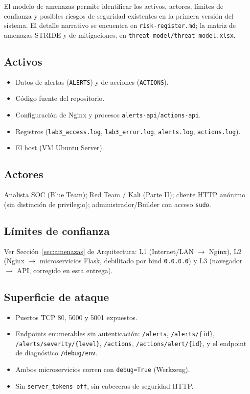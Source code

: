 \documentclass[journal]{IEEEtran}
\begin{document}
El modelo de amenazas permite identificar los activos, actores, límites de
confianza y posibles riesgos de seguridad existentes en la primera versión
del sistema. El detalle narrativo se encuentra en \texttt{risk-register.md};
la matriz de amenazas STRIDE y de mitigaciones, en
\texttt{threat-model/threat-model.xlsx}.

\subsection{Activos}

\begin{itemize}
    \item Datos de alertas (\texttt{ALERTS}) y de acciones (\texttt{ACTIONS}).
    \item Código fuente del repositorio.
    \item Configuración de Nginx y procesos \texttt{alerts-api}/\texttt{actions-api}.
    \item Registros (\texttt{lab3\_access.log}, \texttt{lab3\_error.log},
    \texttt{alerts.log}, \texttt{actions.log}).
    \item El host (VM Ubuntu Server).
\end{itemize}

\subsection{Actores}

Analista SOC (Blue Team); Red Team / Kali (Parte II); cliente HTTP anónimo (sin
distinción de privilegio); administrador/Builder con acceso \texttt{sudo}.

\subsection{Límites de confianza}

Ver Sección~\ref{sec:amenazas} de Arquitectura: L1 (Internet/LAN
$\rightarrow$ Nginx), L2 (Nginx $\rightarrow$ microservicios Flask, debilitado
por bind \texttt{0.0.0.0}) y L3 (navegador $\rightarrow$ API, corregido en
esta entrega).

\subsection{Superficie de ataque}

\begin{itemize}
    \item Puertos TCP 80, 5000 y 5001 expuestos.
    \item Endpoints enumerables sin autenticación: \texttt{/alerts},
    \texttt{/alerts/\{id\}}, \texttt{/alerts/severity/\{level\}},
    \texttt{/actions}, \texttt{/actions/alert/\{id\}}, y el endpoint de
    diagnóstico \texttt{/debug/env}.
    \item Ambos microservicios corren con \texttt{debug=True} (Werkzeug).
    \item Sin \texttt{server\_tokens off}, sin cabeceras de seguridad HTTP.
\end{itemize}
\end{document}
